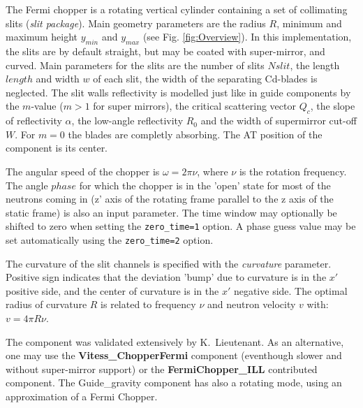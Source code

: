 The Fermi chopper is a rotating vertical cylinder containing a set of collimating slits (\emph{slit package}). Main geometry parameters are the radius $R$, minimum and maximum height $y_{min}$ and $y_{max}$ (see Fig. \ref{fig:Overview}).
In this implementation, the slits are by default straight, but may be coated with super-mirror, and curved. Main parameters for the slits are the number of slits $Nslit$, the length $length$ and width $w$ of each slit, the width of the separating Cd-blades is neglected. The slit walls reflectivity is modelled just like in guide components by the $m$-value ($m > 1$ for super mirrors), the critical scattering vector $Q_c$, the slope of reflectivity $\alpha$, the low-angle reflectivity $R_0$ and the width of supermirror cut-off $W$. For $m=0$ the blades are completly absorbing. The AT position of the component is its center.

The angular speed of the chopper is $\omega = 2\pi \nu$, where $\nu$ is the rotation frequency. The angle $phase$ for which the chopper is in the 'open' state for most of the neutrons coming in (z' axis of the rotating frame parallel to the z axis of the static frame) is also an input parameter. The time window may optionally be shifted to zero when setting the \verb+zero_time=1+ option. A phase guess value may be set automatically using the \verb+zero_time=2+ option.

The curvature of the slit channels is specified with the \textit{curvature} parameter. Positive sign indicates that the deviation 'bump' due to curvature is in the $x'$ positive side, and the center of curvature is in the $x'$ negative side. The optimal radius of curvature $R$ is related to frequency $\nu$ and neutron velocity $v$ with: $v=4 \pi R \nu$.

The component was validated extensively by K.\ Lieutenant. As an alternative, one may use the \textbf{Vitess\_ChopperFermi} component (eventhough slower and without super-mirror support) or the \textbf{FermiChopper\_ILL} contributed component. The Guide\_gravity component has also a rotating mode, using an approximation of a Fermi Chopper.

